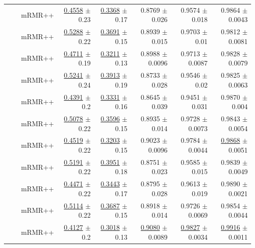 \begin{longtable}{llp{}rrrrr}
 &  & mRMR++ & \underline{0.4558} {\scriptsize $\pm$ 0.23} & \underline{0.3368} {\scriptsize $\pm$ 0.17} & 0.8769 {\scriptsize $\pm$ 0.026} & 0.9574 {\scriptsize $\pm$ 0.018} & 0.9864 {\scriptsize $\pm$ 0.0043} \\
 &  & mRMR++ & \underline{0.5288} {\scriptsize $\pm$ 0.22} & \underline{0.3691} {\scriptsize $\pm$ 0.15} & 0.8939 {\scriptsize $\pm$ 0.015} & 0.9703 {\scriptsize $\pm$ 0.01} & 0.9812 {\scriptsize $\pm$ 0.0081} \\
 &  & mRMR++ & \underline{0.4711} {\scriptsize $\pm$ 0.19} & \underline{0.3211} {\scriptsize $\pm$ 0.13} & 0.8988 {\scriptsize $\pm$ 0.0096} & 0.9713 {\scriptsize $\pm$ 0.0087} & 0.9828 {\scriptsize $\pm$ 0.0079} \\
 &  & mRMR++ & \underline{0.5241} {\scriptsize $\pm$ 0.24} & \underline{0.3913} {\scriptsize $\pm$ 0.19} & 0.8733 {\scriptsize $\pm$ 0.028} & 0.9546 {\scriptsize $\pm$ 0.02} & 0.9825 {\scriptsize $\pm$ 0.0063} \\
 &  & mRMR++ & \underline{0.4391} {\scriptsize $\pm$ 0.2} & \underline{0.3331} {\scriptsize $\pm$ 0.16} & 0.8645 {\scriptsize $\pm$ 0.039} & 0.9451 {\scriptsize $\pm$ 0.031} & 0.9870 {\scriptsize $\pm$ 0.004} \\
 &  & mRMR++ & \underline{0.5078} {\scriptsize $\pm$ 0.22} & \underline{0.3596} {\scriptsize $\pm$ 0.15} & 0.8935 {\scriptsize $\pm$ 0.014} & 0.9728 {\scriptsize $\pm$ 0.0073} & 0.9843 {\scriptsize $\pm$ 0.0054} \\
 &  & mRMR++ & \underline{0.4519} {\scriptsize $\pm$ 0.22} & \underline{0.3203} {\scriptsize $\pm$ 0.15} & 0.9023 {\scriptsize $\pm$ 0.0096} & 0.9784 {\scriptsize $\pm$ 0.0044} & \underline{0.9868} {\scriptsize $\pm$ 0.0051} \\
 &  & mRMR++ & \underline{0.5191} {\scriptsize $\pm$ 0.22} & \underline{0.3951} {\scriptsize $\pm$ 0.18} & 0.8751 {\scriptsize $\pm$ 0.023} & 0.9585 {\scriptsize $\pm$ 0.015} & 0.9839 {\scriptsize $\pm$ 0.0049} \\
 &  & mRMR++ & \underline{0.4471} {\scriptsize $\pm$ 0.22} & \underline{0.3443} {\scriptsize $\pm$ 0.17} & 0.8795 {\scriptsize $\pm$ 0.028} & 0.9613 {\scriptsize $\pm$ 0.019} & 0.9890 {\scriptsize $\pm$ 0.0021} \\
 &  & mRMR++ & \underline{0.5114} {\scriptsize $\pm$ 0.22} & \underline{0.3687} {\scriptsize $\pm$ 0.15} & 0.8918 {\scriptsize $\pm$ 0.014} & 0.9726 {\scriptsize $\pm$ 0.0069} & 0.9854 {\scriptsize $\pm$ 0.0044} \\
 &  & mRMR++ & \underline{0.4127} {\scriptsize $\pm$ 0.2} & \underline{0.3018} {\scriptsize $\pm$ 0.13} & \underline{0.9080} {\scriptsize $\pm$ 0.0089} & \underline{0.9827} {\scriptsize $\pm$ 0.0034} & \underline{0.9916} {\scriptsize $\pm$ 0.0011} \\

\end{longtable}

